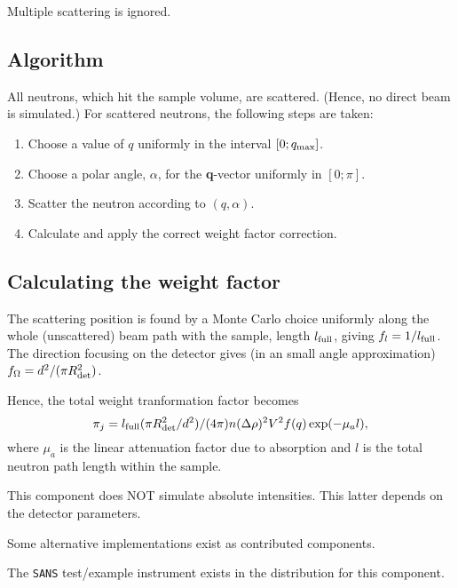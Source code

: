 Multiple scattering is ignored.

\subsection{Algorithm}
All neutrons, which hit the sample volume, are scattered.
(Hence, no direct beam is simulated.)
For scattered neutrons, the following steps are taken:
\begin{enumerate}
\item Choose a value of $q$ uniformly in the interval $[0;q_{\rm max}]$.
\item Choose a polar angle, $\alpha$,
  for the {\bf q}-vector uniformly in $[0;\pi]$.
\item Scatter the neutron according to $(q,\alpha)$.
\item Calculate and apply the correct weight factor correction.
\end{enumerate}

\subsection{Calculating the weight factor}
The scattering position is found by a Monte Carlo choice uniformly
along the whole (unscattered) beam path with the sample, length $l_{\rm full}$, giving
$f_l = 1/l_{\rm full}$. The direction focusing on the detector gives
(in an small angle approximation) $f_\Omega = d^2 / (\pi R_{\rm det}^2)$.

Hence, the total weight tranformation factor becomes %
\begin{equation}
\pi_j = l_{\rm full} (\pi R_{\rm det}^2 / d^2)/(4 \pi)
  n (\Delta\rho)^2 V^2 f(q) \exp(-\mu_a l) ,
\end{equation}
where $\mu_a$ is the linear attenuation factor due to absorption
and $l$ is the total neutron path length within the sample.

This component does NOT simulate absolute intensities. This latter depends on the detector parameters. 

Some alternative implementations exist as contributed components.

The \verb+SANS+ test/example instrument exists in the distribution for this component.